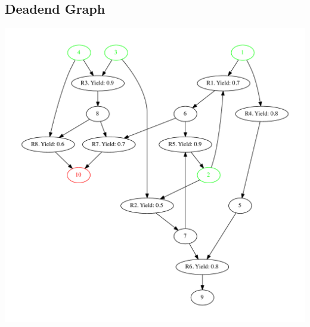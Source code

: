 \documentclass[a4paper,10pt,titlepage]{paper}
\begin{document}
\subsection{Deadend Graph}
\centering
\includegraphics[scale=0.4]{TestGrafer/Deadend.pdf}
\label{Appendix::DeadEnd Graph}
\end{document}
